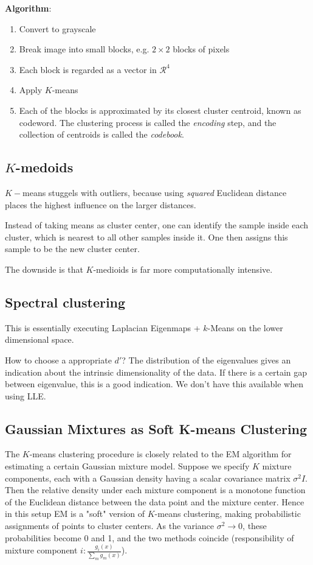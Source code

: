 \textbf{Algorithm}:
\begin{enumerate}
    \item Convert to grayscale
    \item Break image into small blocks, e.g. \(2 \times 2\) blocks of pixels
    \item Each block is regarded as a vector in \(\mathcal{R}^4\)
    \item Apply \(K\)-means
    \item Each of the blocks is approximated by its closest cluster centroid, known as codeword. The clustering process is called the \textit{encoding} step, and the collection of centroids is called the \textit{codebook}.
\end{enumerate}

\subsection*{\(K\)-medoids}
 \(K-\)means stuggels with outliers, because using \textit{squared} Euclidean distance places the highest influence on the larger distances.

 Instead of taking means as cluster center, one can identify the sample inside each cluster, which is nearest to all other samples inside it. One then assigns this sample to be the new cluster center.

 The downside is that \(K\)-medioids is far more computationally intensive.

\subsection*{Spectral clustering}
This is essentially executing Laplacian Eigenmaps + \(k\)-Means on the lower dimensional space.

How to choose a appropriate \(d'\)? The distribution of the eigenvalues gives an indication about the intrinsic dimensionality of the data. If there is a certain gap between eigenvalue, this is a good indication. We don't have this available when using LLE.

\subsection*{Gaussian Mixtures as Soft K-means Clustering}
The \(K\)-means clustering procedure is closely related to the EM algorithm for estimating a certain Gaussian mixture model. Suppose we specify \(K\) mixture components, each with a Gaussian density having a scalar covariance matrix \(\sigma^2 I\). Then the relative density under each mixture component is a monotone function of the Euclidean distance between the data point and the mixture center. Hence in this setup EM is a "soft" version of \(K\)-means clustering, making probabilistic assignments of points to cluster centers. As the variance \(\sigma^2 \rightarrow 0\), these probabilities become 0 and 1, and the two methods coincide (responsibility of mixture component \(i: \frac{g_i(x)}{\sum_m g_m(x)}\)).

